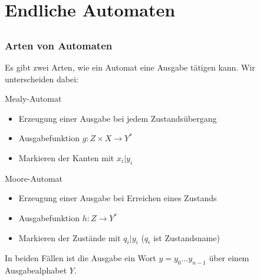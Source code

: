 
\section{Endliche Automaten} %
\subsection*{}
\begin{frame}
  \frametitle{Arten von Automaten}

  Es gibt zwei Arten, wie ein Automat eine Ausgabe tätigen kann. Wir unterscheiden dabei:
  \pause
  \begin{block}{Mealy-Automat}
    \begin{itemize}
      \item Erzeugung einer Ausgabe bei jedem Zustandsübergang
      \item Ausgabefunktion $g: Z \times X \rightarrow Y^*$
      \item Markieren der Kanten mit $x_i|y_i$
    \end{itemize}
   \end{block}
    \pause
   \begin{block}{Moore-Automat}
    \begin{itemize}
      \item Erzeugung einer Ausgabe bei Erreichen eines Zustands
      \item Ausgabefunktion $h: Z \rightarrow Y^*$
      \item Markieren der Zustände mit $q_i|y_i$ ($q_i$ ist Zustandsname)
    \end{itemize}
  \end{block}

  In beiden Fällen ist die Ausgabe ein Wort $y = y_0\ldots y_{n-1}$ über einem
  Ausgabealphabet $Y$.
\end{frame}


